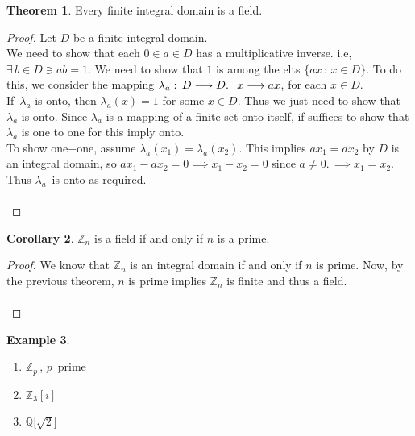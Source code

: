 \documentclass[11pt,a4paper]{article}
\theoremstyle{definition}
\newtheorem{thm}{Theorem}[subsection]
\newtheorem{exa}[thm]{Example}
\newtheorem{coro}[thm]{Corollary}
\begin{document}
\begin{thm}
Every finite integral domain is a field.\\
\end{thm}

\begin{proof}
Let $D$ be a finite integral domain.\\
We need to show that each $0\in a\in D$ has a multiplicative inverse. i.e, $\exists\, b \in D \ni ab = 1$. We need to show that $1$ is among the elts $\{ ax\, :\, x\in D\}$. To do this, we consider the mapping $\lambda_a :\, D\longrightarrow D.\, \hspace{0.2cm} x \longrightarrow ax$, for each $x\in D$.\\
If $\, \lambda_a$  is onto, then $\lambda_a(x)  = 1$ for some $x\in D$. Thus we just need to show that $\lambda_a$ is onto. Since $\lambda_a$ is a mapping of a finite set onto itself, if suffices to show that $\lambda_a$ is one to one for this imply onto.\\
To show one$-$one, assume $\lambda_a(x_1) = \lambda_a(x_2)$. This implies $ax_1 = ax_2$ by $D$ is an integral domain, so $ax_1  - ax_2 = 0\implies x_1 - x_2 = 0$ since $a\neq 0$.$\, \implies x_1 = x_2$.
Thus $\lambda_a\,$ is onto as required.\\\\
\end{proof}







\begin{coro}
$\mathbb{Z}_n$ is a field if and only if $n$ is a prime.\\
\end{coro}

\begin{proof}
We know that $\mathbb{Z}_n$ is an integral domain if and only if $n$ is prime. Now, by the previous theorem, $n$ is prime implies $\mathbb{Z}_n$ is finite and thus a field.\\\\
\end{proof}








\begin{exa}
\begin{enumerate}
\item $\mathbb{Z}_p\, ,\, p\,$ prime
\item $\mathbb{Z}_3[i]$
\item $\mathbb{Q}\big[\sqrt{2}\big]$\\\\
\end{enumerate}
\end{exa}
\end{document}
